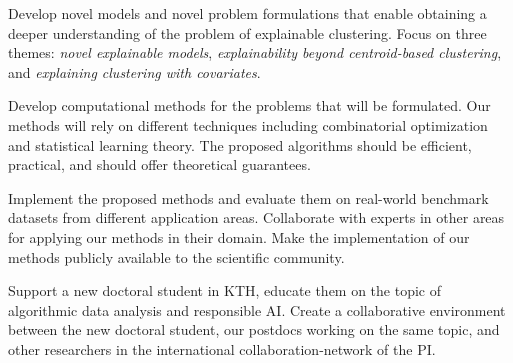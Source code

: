 \documentclass[a4paper,11pt]{article}
\begin{document}
\vspace{-2mm}
\begin{description}
\setlength{\itemsep}{-4pt}
\item[{Models and problems:}]
Develop novel models and novel problem formulations that enable 
obtaining a deeper understanding of the problem of explainable clustering.
Focus on three themes: 
\emph{novel explainable models}, 
\emph{explainability beyond centroid-based clustering}, and 
\emph{explaining clustering with covariates}.

\item[{Algorithms:}]
Develop computational methods for the problems that will be formulated.
Our methods will rely on different techniques
including combinatorial optimization and statistical learning theory.
The proposed algorithms should be efficient, practical, and should offer theoretical guarantees.

\item[{Empirical evaluation and outreach:}]
Implement the proposed methods and evaluate them on 
real-world benchmark datasets from different application areas.
Collaborate with experts in other areas for applying our methods in their domain.
Make the implementation of our methods publicly available to the scientific community.

\item[{Education in KTH:}]
Support a new doctoral student in KTH, 
educate them on the topic of algorithmic data analysis and responsible AI. 
Create a collaborative environment between the new doctoral student, 
our postdocs working on the same topic, 
and other researchers in the international collaboration-network of the PI.
\end{description}

\end{document}
